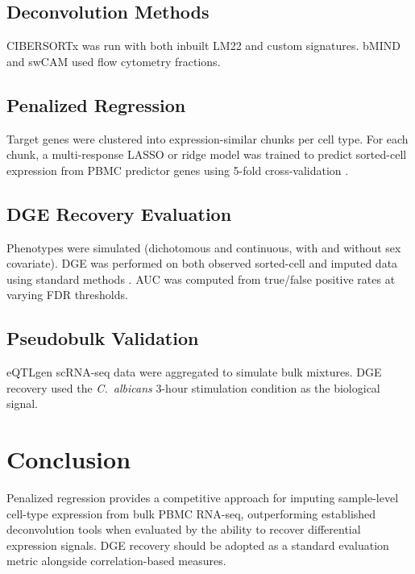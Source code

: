 \documentclass[11pt]{article}
\begin{document}
\subsection{Deconvolution Methods}
CIBERSORTx \citep{newman2019cibersortx} was run with both inbuilt LM22 and custom signatures. bMIND \citep{wang2021bmind} and swCAM \citep{wang2020debcam} used flow cytometry fractions.

\subsection{Penalized Regression}
Target genes were clustered into expression-similar chunks per cell type. For each chunk, a multi-response LASSO or ridge model was trained to predict sorted-cell expression from PBMC predictor genes using 5-fold cross-validation \citep{tibshirani1996lasso, hoerl1970ridge, friedman2010regularization}.

\subsection{DGE Recovery Evaluation}
Phenotypes were simulated (dichotomous and continuous, with and without sex covariate). DGE was performed on both observed sorted-cell and imputed data using standard methods \citep{love2014moderated}. AUC was computed from true/false positive rates at varying FDR thresholds.

\subsection{Pseudobulk Validation}
eQTLgen scRNA-seq data were aggregated to simulate bulk mixtures. DGE recovery used the \textit{C.\ albicans} 3-hour stimulation condition as the biological signal.

\section{Conclusion}

Penalized regression provides a competitive approach for imputing sample-level cell-type expression from bulk PBMC RNA-seq, outperforming established deconvolution tools when evaluated by the ability to recover differential expression signals. DGE recovery should be adopted as a standard evaluation metric alongside correlation-based measures.



\end{document}
